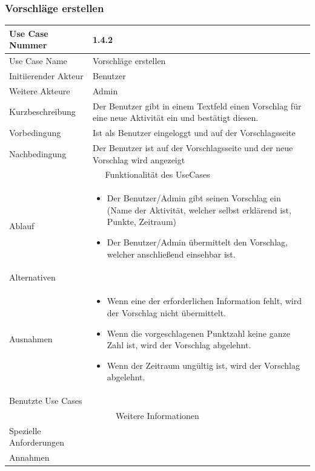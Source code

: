 \documentclass[10pt,a4paper]{article}
\begin{document}
	\subsubsection{Vorschl\"age erstellen}
	\begin{tabular}{|l|p{.5\linewidth}|}
		\hline Use Case Nummer & 1.4.2 \\ 
		\hline Use Case Name & Vorschl\"age erstellen \\ 
		\hline Initiierender Akteur & Benutzer \\
		\hline Weitere Akteure & Admin \\
		\hline Kurzbeschreibung & Der Benutzer gibt in einem Textfeld einen Vorschlag für eine neue Aktivit\"at ein und bestätigt diesen. \\
		\hline Vorbedingung & Ist als Benutzer eingeloggt und auf der Vorschlagsseite \\
		\hline Nachbedingung & Der Benutzer ist auf der Vorschlagsseite und der neue Vorschlag wird angezeigt \\
		\hline \multicolumn{2}{|c|}{Funktionalität des UseCases}\\
		\hline Ablauf & \begin{itemize}
			\item Der Benutzer/Admin gibt seinen Vorschlag ein (Name der Aktivität, welcher selbst erklärend ist, Punkte, Zeitraum)
			\item Der Benutzer/Admin \"ubermittelt den Vorschlag, welcher anschließend einsehbar ist.
		\end{itemize} \\
		\hline Alternativen &  \\
		\hline Ausnahmen & \begin{itemize}
			\item Wenn eine der erforderlichen Information fehlt, wird der Vorschlag nicht \"ubermittelt.
			\item Wenn die vorgeschlagenen Punktzahl keine ganze Zahl ist, wird der Vorschlag abgelehnt.
			\item Wenn der Zeitraum ungültig ist, wird der Vorschlag abgelehnt.
		\end{itemize} \\
		\hline Benutzte Use Cases &  \\
		\hline \multicolumn{2}{|c|}{Weitere Informationen} \\
		\hline Spezielle Anforderungen &  \\
		\hline Annahmen &  \\
		\hline
	\end{tabular}
        
\end{document}
